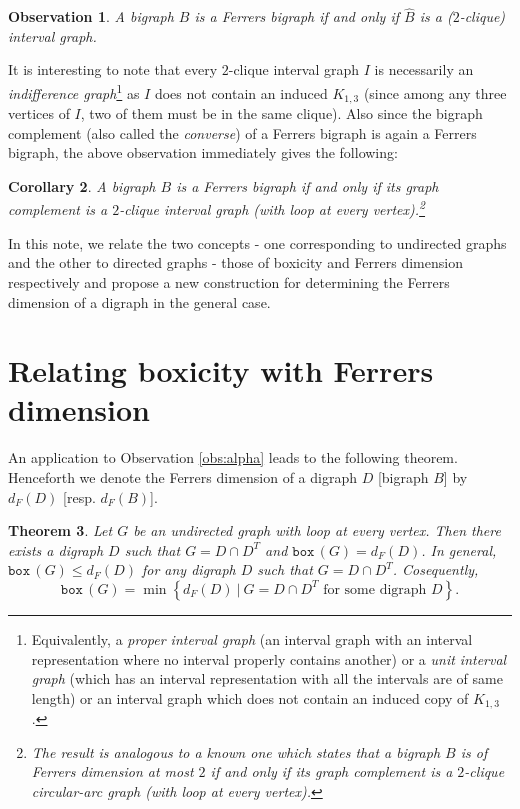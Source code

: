 \documentclass[11pt]{article}
\newtheorem{thm}{Theorem}[section]
\newtheorem{cor}[thm]{Corollary}
\newtheorem{obs}[thm]{Observation}
\theoremstyle{definition}
\theoremstyle{remark}
\numberwithin{equation}{section}
\newcommand{\set}[1]{\left\{#1\right\}}
\newcommand{\Set}[2]{\set{#1\ \vert\ #2}}
\newcommand{\BOX}[1]{\texttt{box}\,(#1)}
\begin{document}
\begin{obs}\label{t:fchar}
A bigraph $B$ is a Ferrers bigraph if and only if $\widehat{B}$ is a ($2$-clique) interval graph.
\end{obs}

It is interesting to note that every $2$-clique interval graph $I$ is necessarily an {\em indifference graph}\footnote{Equivalently, a {\em proper interval graph} (an interval graph with an interval representation where no interval properly contains another) or a {\em unit interval graph} (which has an interval representation with all the intervals are of same length) or an interval graph which does not contain an induced copy of $K_{1,3}$.} as $I$ does not contain an induced $K_{1,3}$ (since among any three vertices of $I$, two of them must be in the same clique). 
Also since the bigraph complement (also called the {\em converse}) of a Ferrers bigraph is again a Ferrers bigraph, the above observation immediately gives the following:

\begin{cor}\label{c:fcomp}
A bigraph $B$ is a Ferrers bigraph if and only if its graph complement is a $2$-clique interval graph (with loop at every vertex).\footnote{The result is analogous to a known one which states that a bigraph $B$ is of Ferrers dimension at most $2$ if and only if its graph complement is a $2$-clique circular-arc graph (with loop at every vertex).}
\end{cor}

In this note, we relate the two concepts - one corresponding to undirected graphs and the other to directed graphs - those of boxicity and Ferrers dimension respectively and propose a new construction for determining the Ferrers dimension of a digraph in the general case.

\section{Relating boxicity with Ferrers dimension}

An application to Observation \ref{obs:alpha} leads to the following theorem. Henceforth we denote the Ferrers dimension of a digraph $D$ [bigraph $B$] by $d_F(D)$ [resp. $d_F(B)$].

\begin{thm} \label{thm:alpha}
Let $G$ be an undirected graph with loop at every vertex. Then there exists a digraph $D$ such that $G=D\cap D^T$ and $\BOX{G}=d_F(D)$. In general, $\BOX{G}\leqslant d_F(D)$ for any digraph $D$ such that $G=D\cap D^T$. Cosequently, 
$$\BOX{G}=\min \Set{d_F (D)}{G=D\cap D^T \textrm{ for some digraph } D}.$$
\end{thm}
\end{document}
